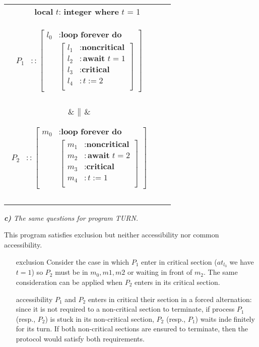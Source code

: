 \documentclass[12pt]{article}
\begin{document}
\medskip
\begin{center}
\begin{tabular}{|ccc|}
\hline
\multicolumn{3}{|c|}{\textbf{local} $t$: \textbf{integer where} $t$ = 1} \\
\parbox{4cm}{\begin{align*}
      P_1 &:: \left[ \begin{aligned}
 		l_0 &: \textbf{loop forever do } \\ 
 			& \left[ \begin{aligned}
 				l_1 &: \textbf{noncritical}\\ 
 				l_2 &: \textbf{await } t = 1\\
 				l_3 &: \textbf{critical}\\
 				l_4 &: t := 2\\
			\end{aligned} \right]
		\end{aligned} \right]\\
   \end{align*}}
   &
	$\big{\|}$   
   &
   \parbox{4cm}{\begin{align*}
      P_2 &:: \left[ \begin{aligned}
 		m_0 &: \textbf{loop forever do } \\ 
 			& \left[ \begin{aligned}
 				m_1 &: \textbf{noncritical}\\ 
 				m_2 &: \textbf{await } t = 2\\
 				m_3 &: \textbf{critical}\\
 				m_4 &: t := 1\\
			\end{aligned} \right]
		\end{aligned} \right]\\
   \end{align*}}\\
    \\\hline
\end{tabular}
\end{center}
\textit{\textbf{c)} The same questions for program TURN.}

This program satisfies exclusion but neither accessibility nor common accessibility.
\begin{itemize}
\item[exclusion] Consider the case in which $P_1$ enter in critical section ($at_{l_3}$ we have $t=1$) so $P_2$ must be in $m_0, m1, m2$ or waiting in front of $m_2$. The same consideration can be applied when $P_2$ enters in its critical section.
\item[accessibility] $P_1$ and $P_2$ enters in critical their section in a forced alternation: since it is not required to a non-critical section to terminate, if process $P_1$ (resp., $P_2$) is stuck in its non-critical section, $P_2$ (resp., $P_1$) waits indefinitely for its turn. If both non-critical sections are ensured to terminate, then the protocol would satisfy both requirements.
\end{itemize}
\end{document}
